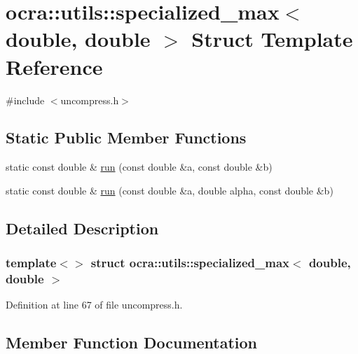 \hypertarget{structocra_1_1utils_1_1specialized__max_3_01double_00_01double_01_4}{}\section{ocra\+:\+:utils\+:\+:specialized\+\_\+max$<$ double, double $>$ Struct Template Reference}
\label{structocra_1_1utils_1_1specialized__max_3_01double_00_01double_01_4}


{\ttfamily \#include $<$uncompress.\+h$>$}

\subsection*{Static Public Member Functions}
\begin{DoxyCompactItemize}
\item 
static const double \& \hyperlink{structocra_1_1utils_1_1specialized__max_3_01double_00_01double_01_4_a6a017a4bca601f01e4a40c2e34761388}{run} (const double \&a, const double \&b)
\item 
static const double \& \hyperlink{structocra_1_1utils_1_1specialized__max_3_01double_00_01double_01_4_a61ca4eb326268e49b5e44cd042dde4ce}{run} (const double \&a, double alpha, const double \&b)
\end{DoxyCompactItemize}


\subsection{Detailed Description}
\subsubsection*{template$<$$>$\newline
struct ocra\+::utils\+::specialized\+\_\+max$<$ double, double $>$}



Definition at line 67 of file uncompress.\+h.



\subsection{Member Function Documentation}
\hypertarget{structocra_1_1utils_1_1specialized__max_3_01double_00_01double_01_4_a6a017a4bca601f01e4a40c2e34761388}{}\label{structocra_1_1utils_1_1specialized__max_3_01double_00_01double_01_4_a6a017a4bca601f01e4a40c2e34761388} 
